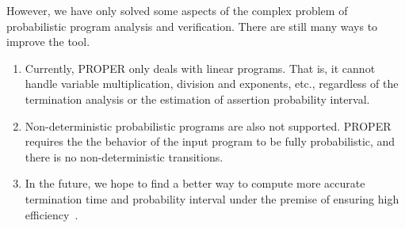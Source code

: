 \documentclass[sigconf,review, anonymous]{acmart}
\begin{document}
However, we have only solved some aspects of the complex problem of probabilistic program analysis and verification. There are still many ways to improve the tool.
\begin{enumerate}
	\item Currently, PROPER only deals with linear programs. That is, it cannot handle variable multiplication, division and exponents, etc., regardless of the termination analysis or the estimation of assertion probability interval.
	\item Non-deterministic probabilistic programs  are also not supported. PROPER requires the the behavior of the input program to be fully probabilistic, and there is no non-deterministic transitions. 
	\item In the future, we hope to find a better way to compute more accurate termination time and probability interval under the premise of ensuring high efficiency~\cite{Hermanns2013Probabilistic}. 
\end{enumerate}




\end{document}
